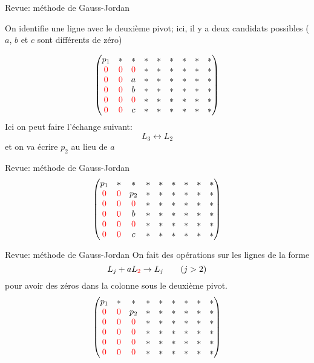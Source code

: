 \documentclass[french, handout]{beamer}
\begin{document}
\begin{frame}{Revue: méthode de Gauss-Jordan}

On identifie une ligne avec le deuxième pivot; ici,
il y a deux candidats possibles ($a$, $b$ et $c$ sont
différents de zéro)

\[
\begin{pmatrix}
p_1 & *  & * & * & * & * & * & * & * \\
{\color{red}{0}} & {\color{red}{0}} & {\color{red}{0}} & * & * & * & * & * & * \\
{\color{red}{0}} & {\color{red}{0}} & a & * & * & * & * & * & * \\
{\color{red}{0}} & {\color{red}{0}} & b & * & * & * & * & * & * \\
{\color{red}{0}} & {\color{red}{0}} & {\color{red}{0}} & * & * & * & * & * & * \\
{\color{red}{0}} & {\color{red}{0}} & c & * & * & * & * & * & * 
\end{pmatrix}
\]
Ici on peut faire l'échange suivant:
\Huge
\[
 L_3 \leftrightarrow L_2
\]
\normalsize
et on va écrire $p_2$ au lieu de $a$
\end{frame}	
	
\begin{frame}{Revue: méthode de Gauss-Jordan}
\[
\begin{pmatrix}
p_1 & *  & * & * & * & * & * & * & * \\
{\color{red}{0}} & {\color{red}{0}} & p_2 & * & * & * & * & * & * \\
{\color{red}{0}} & {\color{red}{0}} & {\color{red}{0}} & * & * & * & * & * & * \\

{\color{red}{0}} & {\color{red}{0}} & b & * & * & * & * & * & * \\
{\color{red}{0}} & {\color{red}{0}} & {\color{red}{0}} & * & * & * & * & * & * \\
{\color{red}{0}} & {\color{red}{0}} & c & * & * & * & * & * & * 
\end{pmatrix}
\]
\end{frame}		
	
\begin{frame}{Revue: méthode de Gauss-Jordan}
On fait des opérations sur les lignes de la forme 
\Huge
\[
 L_j + a L_{\color{red}2} \rightarrow L_j \qquad(j > 2)
\]
\normalsize
pour avoir des zéros dans la colonne sous le deuxième pivot.
\[
\begin{pmatrix}
p_1 & *  & * & * & * & * & * & * & * \\
{\color{red}{0}} & {\color{red}{0}} & p_2 & * & * & * & * & * & * \\
{\color{red}{0}} & {\color{red}{0}} & {\color{red}{0}} & * & * & * & * & * & * \\

{\color{red}{0}} & {\color{red}{0}} & {\color{red}{0}}  & * & * & * & * & * & * \\
{\color{red}{0}} & {\color{red}{0}} & {\color{red}{0}} & * & * & * & * & * & * \\
{\color{red}{0}} & {\color{red}{0}} & {\color{red}{0}}  & * & * & * & * & * & * 
\end{pmatrix}
\]
\end{frame}		
	
\end{document}

